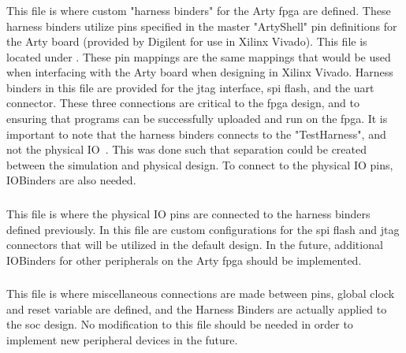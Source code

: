 \subsubsection{}\label{sec:Customizing_FPGA-HarnessBinders.scala}
This file is where custom "harness binders" for the Arty \Gls{fpga} are defined.
These harness binders utilize pins specified in the master "ArtyShell" pin definitions for the Arty board (provided by Digilent for use in Xilinx Vivado).
This file is located under .
These pin mappings are the same mappings that would be used when interfacing with the Arty board when designing in Xilinx Vivado.
Harness binders in this file are provided for the \Gls{jtag} interface, \Gls{spi} flash, and the \Gls{uart}  connector.
These three connections are critical to the \Gls{fpga} design, and to ensuring that programs can be successfully uploaded and run on the \Gls{fpga}.
It is important to note that the harness binders connects to the "TestHarness", and not the physical IO~\cite{Chipyard_IO}.
This was done such that separation could be created between the simulation and physical design.
To connect to the physical IO pins, IOBinders are also needed.

\subsubsection{}\label{sec:Customizing_FPGA-IOBinders.scala}
This file is where the physical IO pins are connected to the harness binders defined previously.
In this file are custom configurations for the \Gls{spi} flash and \Gls{jtag} connectors that will be utilized in the default design.
In the future, additional IOBinders for other peripherals on the Arty \Gls{fpga} should be implemented.

\subsubsection{}\label{sec:Customizing_FPGA-TestHarness.scala}
This file is where miscellaneous connections are made between pins, global clock and reset variable are defined, and the Harness Binders are actually applied to the \Gls{soc} design.
No modification to this file should be needed in order to implement new peripheral devices in the future.


